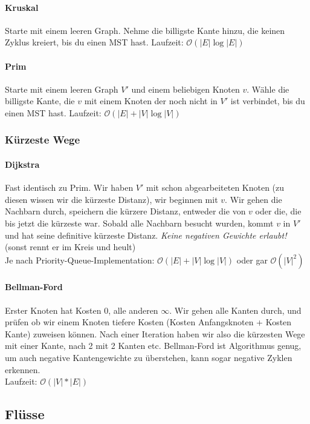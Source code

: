 \documentclass[a4paper, 9pt, DIV=20]{scrartcl}
\newcommand{\Oh}{\mathcal{O}}
\begin{document}
\paragraph{Kruskal} Starte mit einem leeren Graph. Nehme die billigste Kante hinzu, die keinen Zyklus kreiert, bis du einen MST hast. Laufzeit: $\Oh(|E| \log{|E|})$

\paragraph{Prim} Starte mit einem leeren Graph $V'$ und einem beliebigen Knoten $v$. Wähle die billigste Kante, die $v$ mit einem Knoten der noch nicht in $V'$ ist verbindet, bis du einen MST hast. Laufzeit: $\Oh(|E| + |V| \log{|V|})$

\subsubsection{Kürzeste Wege}

\paragraph{Dijkstra} Fast identisch zu Prim. Wir haben $V'$ mit schon abgearbeiteten Knoten (zu diesen wissen wir die kürzeste Distanz), wir beginnen mit $v$. Wir gehen die Nachbarn durch, speichern die kürzere Distanz, entweder die von $v$ oder die, die bis jetzt die kürzeste war. Sobald alle Nachbarn besucht wurden, kommt $v$ in $V'$ und hat seine definitive kürzeste Distanz. \emph{Keine negativen Gewichte erlaubt!} (sonst rennt er im Kreis und heult) \\
Je nach Priority-Queue-Implementation: $\Oh(|E|+|V|\log{|V|})$ oder gar $\Oh(|V|^2)$

\paragraph{Bellman-Ford} Erster Knoten hat Kosten 0, alle anderen $\infty$. Wir gehen alle Kanten durch, und prüfen ob wir einem Knoten tiefere Kosten (Kosten Anfangsknoten + Kosten Kante) zuweisen können. Nach einer Iteration haben wir also die kürzesten Wege mit einer Kante, nach 2 mit 2 Kanten etc. Bellman-Ford ist Algorithmus genug, um auch negative Kantengewichte zu überstehen, kann sogar negative Zyklen erkennen. \\ Laufzeit: $\Oh(|V|*|E|)$


\subsection{Flüsse}\label{flowalgos}
\end{document}
